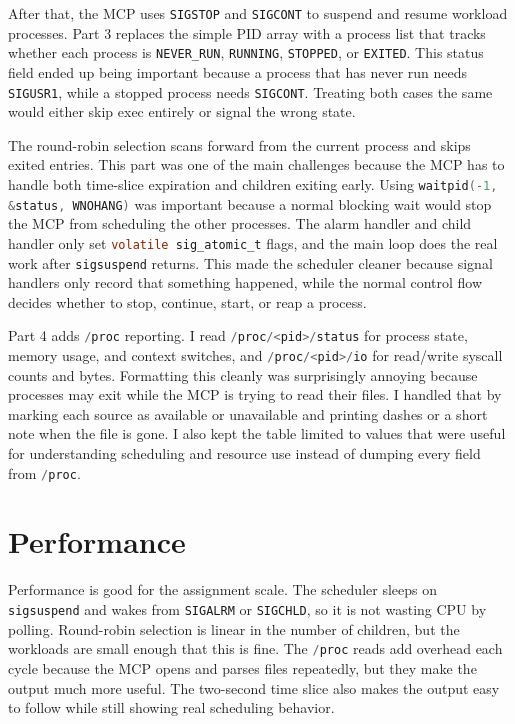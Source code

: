 \documentclass[12pt]{article}
\begin{document}
After that, the MCP uses \lstinline[language=C]|SIGSTOP| and \lstinline[language=C]|SIGCONT| to suspend and resume workload processes. Part 3 replaces the simple PID array with a process list that tracks whether each process is \lstinline[language=C]|NEVER_RUN|, \lstinline[language=C]|RUNNING|, \lstinline[language=C]|STOPPED|, or \lstinline[language=C]|EXITED|. This status field ended up being important because a process that has never run needs \lstinline[language=C]|SIGUSR1|, while a stopped process needs \lstinline[language=C]|SIGCONT|. Treating both cases the same would either skip exec entirely or signal the wrong state.

The round-robin selection scans forward from the current process and skips exited entries. This part was one of the main challenges because the MCP has to handle both time-slice expiration and children exiting early. Using \lstinline[language=C]|waitpid(-1, &status, WNOHANG)| was important because a normal blocking wait would stop the MCP from scheduling the other processes. The alarm handler and child handler only set \lstinline[language=C]|volatile sig_atomic_t| flags, and the main loop does the real work after \lstinline[language=C]|sigsuspend| returns. This made the scheduler cleaner because signal handlers only record that something happened, while the normal control flow decides whether to stop, continue, start, or reap a process.

Part 4 adds \lstinline[language=C]|/proc| reporting. I read \lstinline[language=C]|/proc/<pid>/status| for process state, memory usage, and context switches, and \lstinline[language=C]|/proc/<pid>/io| for read/write syscall counts and bytes. Formatting this cleanly was surprisingly annoying because processes may exit while the MCP is trying to read their files. I handled that by marking each source as available or unavailable and printing dashes or a short note when the file is gone. I also kept the table limited to values that were useful for understanding scheduling and resource use instead of dumping every field from \lstinline[language=C]|/proc|.

\section{Performance}
Performance is good for the assignment scale. The scheduler sleeps on \lstinline[language=C]|sigsuspend| and wakes from \lstinline[language=C]|SIGALRM| or \lstinline[language=C]|SIGCHLD|, so it is not wasting CPU by polling. Round-robin selection is linear in the number of children, but the workloads are small enough that this is fine. The \lstinline[language=C]|/proc| reads add overhead each cycle because the MCP opens and parses files repeatedly, but they make the output much more useful. The two-second time slice also makes the output easy to follow while still showing real scheduling behavior.
\end{document}
